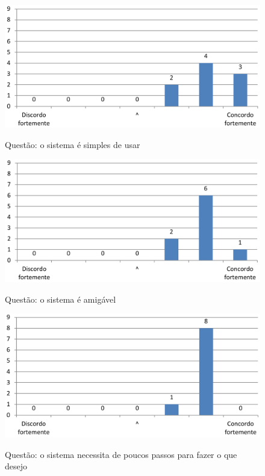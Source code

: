 \begin{figure}[ht]
\centering
\caption{Questão: o sistema é simples de usar}
\includegraphics[width=1.0\textwidth]{use/fu_simples_usar.pdf} 
\label{fig:fu_simples_usar} 
\end{figure}


\begin{figure}[h]
\centering
\caption{Questão: o sistema é amigável}
\includegraphics[width=1.0\textwidth]{use/fu_amigavel.pdf} 
\label{fig:fu_amigavel} 
\end{figure}


\begin{figure}[h]
\centering
\caption{Questão: o sistema necessita de poucos passos para fazer o que desejo}
\includegraphics[width=1.0\textwidth]{use/fu_poucos_passos.pdf} 
\label{fig:fu_poucos_passos} 
\end{figure}



